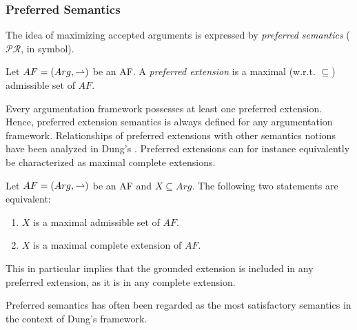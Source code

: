 \subsubsection[Preferred Semantics]{Preferred Semantics }


The idea of maximizing accepted arguments is expressed by \textit{preferred semantics} ({\color{purple} $\mathcal{PR}$}, in symbol).


\begin{df}
    Let $AF=(Arg,\rightharpoonup)$ be an AF. 
    A  \textit{preferred extension} is a maximal (w.r.t. $\subseteq$) admissible set of $AF$. 
\end{df}



Every argumentation framework possesses at least one preferred extension.
Hence, 
preferred extension semantics is always defined for any argumentation framework. 
% 
Relationships of preferred extensions with other semantics notions have been analyzed in Dung's \cite{Dun1995}. 
%
Preferred extensions can for instance equivalently be characterized as maximal complete extensions.


\begin{prop}
    Let $AF=(Arg,\rightharpoonup)$ be an AF and $X \subseteq Arg$. 
    The following two statements are equivalent:
    \begin{enumerate}[itemsep=5pt,parsep=5pt,leftmargin=3em,topsep=5pt,label=(\arabic*)] 
        \item $X$ is a maximal admissible set of $AF$.
        
        \item $X$ is a maximal complete extension of $AF$.
    \end{enumerate}
\end{prop}


This in particular implies that the grounded extension is included in any preferred extension, 
as it is in any complete extension.


Preferred semantics has often been regarded as the most satisfactory semantics in the context of Dung's framework.



